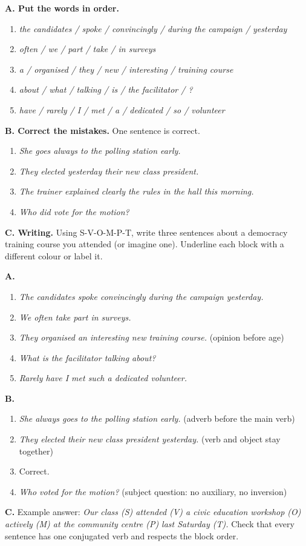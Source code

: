 \documentclass[11pt]{article}
\begin{document}
\begin{exercice}
\textbf{A. Put the words in order.}
\begin{enumerate}
\item \emph{the candidates / spoke / convincingly / during the campaign / yesterday}
\item \emph{often / we / part / take / in surveys}
\item \emph{a / organised / they / new / interesting / training course}
\item \emph{about / what / talking / is / the facilitator / ?}
\item \emph{have / rarely / I / met / a / dedicated / so / volunteer}
\end{enumerate}
\textbf{B. Correct the mistakes.} One sentence is correct.
\begin{enumerate}
\item \emph{She goes always to the polling station early.}
\item \emph{They elected yesterday their new class president.}
\item \emph{The trainer explained clearly the rules in the hall this morning.}
\item \emph{Who did vote for the motion?}
\end{enumerate}
\textbf{C. Writing.} Using S-V-O-M-P-T, write three sentences about a democracy training course you attended (or imagine one). Underline each block with a different colour or label it.
\end{exercice}

\begin{corrige}
\textbf{A.}
\begin{enumerate}
\item \emph{The candidates spoke convincingly during the campaign yesterday.}
\item \emph{We often take part in surveys.}
\item \emph{They organised an interesting new training course.} (opinion before age)
\item \emph{What is the facilitator talking about?}
\item \emph{Rarely have I met such a dedicated volunteer.}
\end{enumerate}
\textbf{B.}
\begin{enumerate}
\item \emph{She always goes to the polling station early.} (adverb before the main verb)
\item \emph{They elected their new class president yesterday.} (verb and object stay together)
\item Correct.
\item \emph{Who voted for the motion?} (subject question: no auxiliary, no inversion)
\end{enumerate}
\textbf{C.} Example answer: \emph{Our class (S) attended (V) a civic education workshop (O) actively (M) at the community centre (P) last Saturday (T).} Check that every sentence has one conjugated verb and respects the block order.
\end{corrige}
\end{document}
